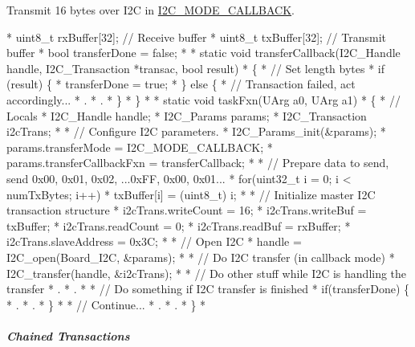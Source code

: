 Transmit 16 bytes over I2\-C in \hyperlink{_i2_c_8h_a39f3b9340fc4ee241b0d2da9b2841c26a129731a7edeb285f43a54b2cf9f5ac72}{I2\-C\-\_\-\-M\-O\-D\-E\-\_\-\-C\-A\-L\-L\-B\-A\-C\-K}. 
\begin{DoxyCode}
*  uint8\_t rxBuffer[32];            \textcolor{comment}{// Receive buffer}
*  uint8\_t txBuffer[32];            \textcolor{comment}{// Transmit buffer}
*  \textcolor{keywordtype}{bool} transferDone = \textcolor{keyword}{false};
*
*  \textcolor{keyword}{static} \textcolor{keywordtype}{void} transferCallback(I2C_Handle handle, I2C_Transaction *transac, \textcolor{keywordtype}{bool} result)
*  \{
*      \textcolor{comment}{// Set length bytes}
*      \textcolor{keywordflow}{if} (result) \{
*          transferDone = \textcolor{keyword}{true};
*      \} \textcolor{keywordflow}{else} \{
*          \textcolor{comment}{// Transaction failed, act accordingly...}
*          .
*          .
*      \}
*  \}
*
*  \textcolor{keyword}{static} \textcolor{keywordtype}{void} taskFxn(UArg a0, UArg a1)
*  \{
*      \textcolor{comment}{// Locals}
*      I2C_Handle handle;
*      I2C_Params params;
*      I2C_Transaction i2cTrans;
*
*      \textcolor{comment}{// Configure I2C parameters.}
*      I2C_Params_init(&params);
*      params.transferMode = I2C_MODE_CALLBACK;
*      params.transferCallbackFxn = transferCallback;
*
*      \textcolor{comment}{// Prepare data to send, send 0x00, 0x01, 0x02, ...0xFF, 0x00, 0x01...}
*      \textcolor{keywordflow}{for}(uint32\_t i = 0; i < numTxBytes; i++)
*          txBuffer[i] = (uint8\_t) i;
*
*      \textcolor{comment}{// Initialize master I2C transaction structure}
*      i2cTrans.writeCount   = 16;
*      i2cTrans.writeBuf     = txBuffer;
*      i2cTrans.readCount    = 0;
*      i2cTrans.readBuf      = rxBuffer;
*      i2cTrans.slaveAddress = 0x3C;
*
*      \textcolor{comment}{// Open I2C}
*      handle = I2C_open(Board\_I2C, &params);
*
*      \textcolor{comment}{// Do I2C transfer (in callback mode)}
*      I2C_transfer(handle, &i2cTrans);
*
*      \textcolor{comment}{// Do other stuff while I2C is handling the transfer}
*      .
*      .
*
*      \textcolor{comment}{// Do something if I2C transfer is finished}
*      \textcolor{keywordflow}{if}(transferDone) \{
*          .
*          .
*      \}
*
*      \textcolor{comment}{// Continue...}
*      .
*      .
*  \}
*  
\end{DoxyCode}


\subparagraph*{Chained Transactions}

